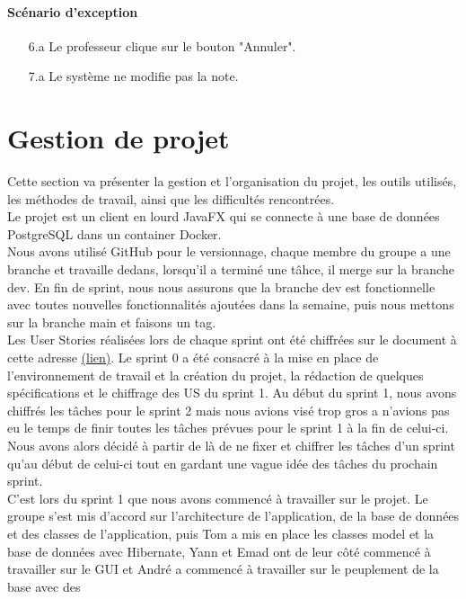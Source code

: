 \documentclass[a4paper,12pt]{article}
\begin{document}
\paragraph{Scénario d'exception}
\begin{enumerate}
    \item[6.a] Le professeur clique sur le bouton "Annuler".
    \item[7.a] Le système ne modifie pas la note.
\end{enumerate}


\section{Gestion de projet}
Cette section va présenter la gestion et l'organisation du projet, les outils utilisés, les méthodes de travail, ainsi que les difficultés rencontrées.\\
Le projet est un client en lourd JavaFX qui se connecte à une base de données PostgreSQL dans un container Docker.\\
Nous avons utilisé GitHub pour le versionnage, chaque membre du groupe a une branche et travaille dedans, lorsqu'il a terminé une tâhce, il merge sur la branche dev. En fin de sprint, 
nous nous assurons que la branche dev est fonctionnelle avec toutes nouvelles fonctionnalités ajoutées dans la semaine, puis nous mettons sur la branche main et faisons un tag.\\
Les User Stories réalisées lors de chaque sprint ont été chiffrées sur le document à cette adresse \href{https://docs.google.com/spreadsheets/d/1I3lit2K54TSlTaCaFj2Z68BY6hvbYxaZbvtNGo1Lqdk/edit?usp=sharing}{(lien)}.
Le sprint 0 a été consacré à la mise en place de l'environnement de travail et la création du projet, la rédaction de quelques spécifications et le chiffrage des US du sprint 1.
Au début du sprint 1, nous avons chiffrés les tâches pour le sprint 2 mais nous avions visé trop gros a n'avions pas eu le temps de finir toutes les tâches prévues pour le sprint 1 à la fin de celui-ci.
Nous avons alors décidé à partir de là de ne fixer et chiffrer les tâches d'un sprint qu'au début de celui-ci tout en gardant une vague idée des tâches du prochain sprint.\\
C'est lors du sprint 1 que nous avons commencé à travailler sur le projet. Le groupe s'est mis d'accord sur l'architecture de l'application, de la base de données et des classes de l'application, puis 
Tom a mis en place les classes model et la base de données avec Hibernate, Yann et Emad ont de leur côté commencé à travailler sur le GUI et André a commencé à travailler sur le peuplement de la base avec des
\end{document}
